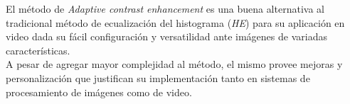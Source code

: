 El método de \emph{Adaptive contrast enhancement} es una buena alternativa al
tradicional método de ecualización del histograma (\emph{HE}) para su aplicación
en video dada su fácil configuración y versatilidad ante imágenes de
variadas características.\\

A pesar de agregar mayor complejidad al método, el mismo provee mejoras
y personalización que justifican su implementación tanto en sistemas
de procesamiento de imágenes como de video.

